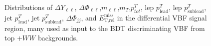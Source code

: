 \begin{figure}[!h]
{  }\hfill
  \hfill
{\caption{Distributions of $\Delta Y_{\ell\ell}$, $\Delta \Phi_{\ell\ell}$,$m_{\ell\ell}$,$m_T$,$p^T_{tot}$, lep $p^T_{\text{lead}}$, lep $p^T_{\text{sublead}}$, jet $p^T_{\text{lead}}$, jet $p^T_{\text{sublead}}$, $\Delta \Phi_{jj}$, and $\ensuremath{E_{\text{T,rel}}^{\text{miss}}}$ in the differential VBF signal region, many used as input to the BDT discriminating VBF from top $+WW$ backgrounds.
\label{fig:signalregion}}}
\end{figure}  

